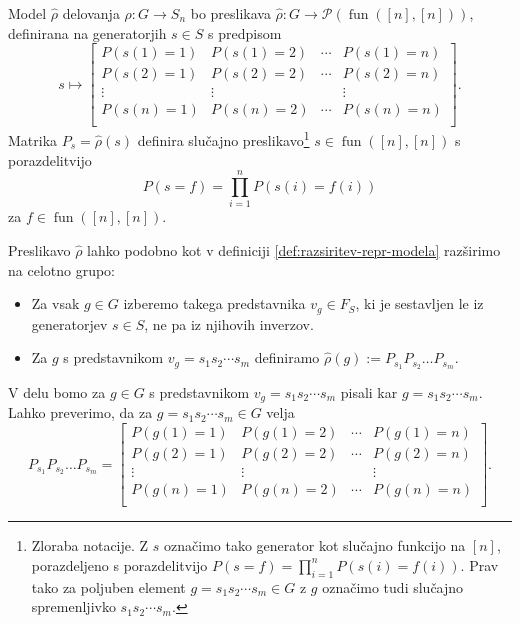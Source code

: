 \documentclass[mat2, tisk]{fmfdelo}
\newcommand{\fun}{\operatorname{fun}}
\newcommand{\funnn}[1]{\fun([#1], [#1])}
\begin{document}
Model $\hat \rho$ delovanja $\rho \colon G \to S_n$ bo
preslikava $\hat \rho \colon G \to \mathcal{P}(\funnn{n})$,
definirana na generatorjih $s \in S$ s predpisom
\begin{equation}
  \label{eq: model za delovanja}
  s \mapsto
  \begin{bmatrix}
    P(s(1) = 1) & P(s(1) = 2) & \dotsm & P(s(1) = n) \\
    P(s(2) = 1) & P(s(2) = 2) & \dotsm & P(s(2) = n) \\
    \vdots & \vdots & & \vdots \\
    P(s(n) = 1) & P(s(n) = 2) & \dotsm & P(s(n) = n) \\
  \end{bmatrix}.
\end{equation}
Matrika $P_s =
\hat\rho(s)$ definira slučajno preslikavo\footnote{Zloraba
  notacije. Z $s$ označimo tako generator kot
  slučajno funkcijo na $[n]$, porazdeljeno s
  porazdelitvijo $P(s = f) = \prod_{i=1}^n P(s(i) = f(i))$.
  Prav tako za poljuben element $g=s_1s_2\dotsm s_m \in G$
z $g$ označimo tudi slučajno spremenljivko $s_1 s_2 \dotsm s_m$.}
$s \in \funnn{n}$ s porazdelitvijo
$$P(s = f) = \prod_{i=1}^n P(s(i) = f(i))$$
za $f \in \funnn{n}$.
%
\begin{definicija}
  Preslikavo $\hat \rho$ lahko podobno kot v definiciji
  \ref{def:razsiritev-repr-modela} razširimo na
  celotno grupo:
  \begin{itemize}
    \item Za vsak $g \in G$ izberemo
      takega predstavnika $v_g \in F_S$, ki je sestavljen le iz
      generatorjev $s \in S$, ne pa iz njihovih
      inverzov.
    \item Za $g$ s predstavnikom $v_g = s_1 s_2 \dotsm
      s_m$ definiramo
      $\hat \rho(g) :=  P_{s_1} P_{s_2} \dotsc P_{s_m}$.
  \end{itemize}
\end{definicija}
%
V delu bomo za $g\in G$ s predstavnikom
$v_g = s_1 s_2 \dotsm s_m  $ pisali kar
$g = s_1 s_2 \dotsm s_m$.
Lahko preverimo, da za $g = s_1 s_2 \dotsm s_m \in G$ velja $$
P_{s_1} P_{s_2} \dotsc P_{s_m} =
\begin{bmatrix}
  P(g(1) = 1) & P(g(1) = 2) & \dotsm & P(g(1) = n) \\
  P(g(2) = 1) & P(g(2) = 2) & \dotsm & P(g(2) = n) \\
  \vdots & \vdots & & \vdots \\
  P(g(n) = 1) & P(g(n) = 2) & \dotsm & P(g(n) = n) \\
\end{bmatrix}.
$$
\end{document}
